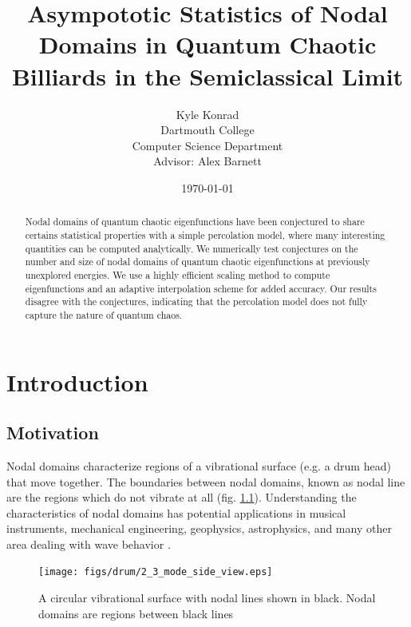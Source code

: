 \documentclass{report}
\begin{document}
\title{Asympototic Statistics of Nodal Domains in Quantum Chaotic Billiards in the Semiclassical Limit}
\author{Kyle Konrad\\
  Dartmouth College\\
  Computer Science Department\\
  Advisor: Alex Barnett}
\date{\today}

\maketitle

\begin{abstract}
  Nodal domains of quantum chaotic eigenfunctions have been conjectured to share certains statistical properties with a simple percolation model, where many interesting quantities can be computed analytically. We numerically test conjectures on the number and size of nodal domains of quantum chaotic eigenfunctions at previously unexplored energies. We use a highly efficient scaling method to compute eigenfunctions and an adaptive interpolation scheme for added accuracy. Our results disagree with the conjectures, indicating that the percolation model does not fully capture the nature of quantum chaos.
\end{abstract}

\chapter{Introduction}
\label{chap:intro}
\section{Motivation}
\label{sec:motivation}
Nodal domains characterize regions of a vibrational surface (e.g. a drum head) that move together. The boundaries between nodal domains, known as nodal line are the regions which do not vibrate at all (fig. \ref{fig:drum}). Understanding the characteristics of nodal domains has potential applications in musical instruments, mechanical engineering, geophysics, astrophysics, and many other area dealing with wave behavior \cite{wigman}.

\begin{figure}
  \begin{center}
    \texttt{[image: figs/drum/2\_3\_mode\_side\_view.eps]}
    \caption{A circular vibrational surface with nodal lines shown in black. Nodal domains are regions between black lines}
    \label{fig:drum}
  \end{center}
\end{figure}
\end{document}

